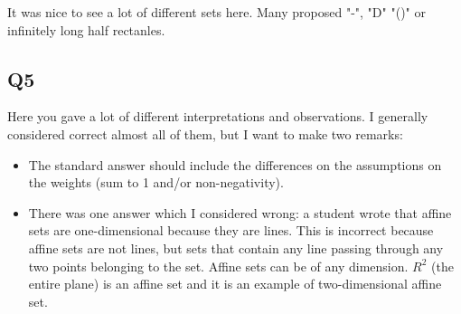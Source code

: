 It was nice to see a lot of different sets here. Many proposed "-", "D" "()" or infinitely long half rectanles.

\subsection*{Q5}

Here you gave a lot of different interpretations and observations. I generally considered correct almost all of them, but I want to make two remarks: 

\begin{itemize}
    \item The standard answer should include the differences on the assumptions on the weights (sum to 1 and/or non-negativity). 
    \item There was one answer which I considered wrong: a student wrote that affine sets are one-dimensional because they are lines. This is incorrect because affine sets are not lines, but sets that contain any line passing through any two points belonging to the set. Affine sets can be of any dimension. $R^2$ (the entire plane) is an affine set and it is an example of two-dimensional affine set.
\end{itemize}

